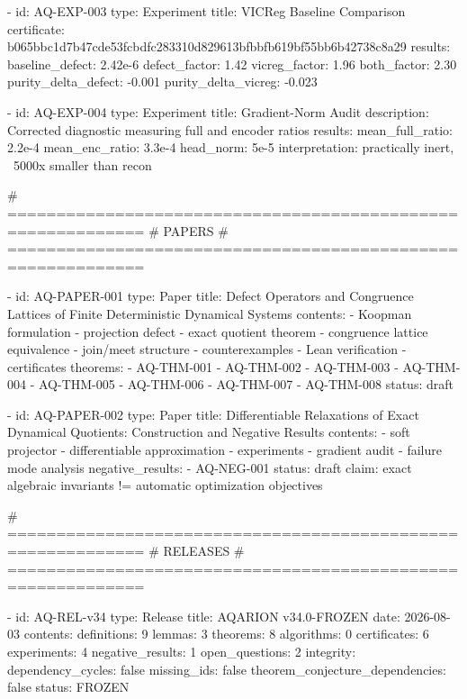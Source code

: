 {{{{{{{{{{{{{  - id: AQ-EXP-003
    type: Experiment
    title: VICReg Baseline Comparison
    certificate: b065bbc1d7b47cde53fcbdfc283310d829613bfbbfb619bf55bb6b42738c8a29
    results:
      baseline_defect: 2.42e-6
      defect_factor: 1.42
      vicreg_factor: 1.96
      both_factor: 2.30
      purity_delta_defect: -0.001
      purity_delta_vicreg: -0.023

  - id: AQ-EXP-004
    type: Experiment
    title: Gradient-Norm Audit
    description: Corrected diagnostic measuring full and encoder ratios
    results:
      mean_full_ratio: 2.2e-4
      mean_enc_ratio: 3.3e-4
      head_norm: 5e-5
      interpretation: practically inert, ~5000x smaller than recon

  # ============================================================
  # PAPERS
  # ============================================================

  - id: AQ-PAPER-001
    type: Paper
    title: Defect Operators and Congruence Lattices of Finite Deterministic Dynamical Systems
    contents:
      - Koopman formulation
      - projection defect
      - exact quotient theorem
      - congruence lattice equivalence
      - join/meet structure
      - counterexamples
      - Lean verification
      - certificates
    theorems:
      - AQ-THM-001
      - AQ-THM-002
      - AQ-THM-003
      - AQ-THM-004
      - AQ-THM-005
      - AQ-THM-006
      - AQ-THM-007
      - AQ-THM-008
    status: draft

  - id: AQ-PAPER-002
    type: Paper
    title: Differentiable Relaxations of Exact Dynamical Quotients: Construction and Negative Results
    contents:
      - soft projector
      - differentiable approximation
      - experiments
      - gradient audit
      - failure mode analysis
    negative_results:
      - AQ-NEG-001
    status: draft
    claim: exact algebraic invariants != automatic optimization objectives

  # ============================================================
  # RELEASES
  # ============================================================

  - id: AQ-REL-v34
    type: Release
    title: AQARION v34.0-FROZEN
    date: 2026-08-03
    contents:
      definitions: 9
      lemmas: 3
      theorems: 8
      algorithms: 0
      certificates: 6
      experiments: 4
      negative_results: 1
      open_questions: 2
    integrity:
      dependency_cycles: false
      missing_ids: false
      theorem_conjecture_dependencies: false
    status: FROZEN

}}}}}}}}}}}}}
